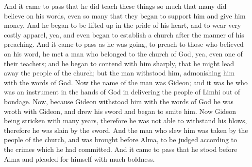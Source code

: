 And it came to pass that he did teach these things so much that many did believe on his words, even so many that they began to support him and give him money.
\bverse \iffalse And he began to be lifted up in the pride of his heart, and to wear very costly apparel, yea, and even began to establish a church after the manner of his preaching. \fi
And he began to be lifted up in the pride of his heart, and to wear very costly apparel, yea, and even began to establish a church after the manner of his preaching.
\bverse \iffalse And it came to pass as he was going, to preach to those who believed on his word, he met a man who belonged to the church of God, yea, even one of their teachers; and he began to contend with him sharply, that he might lead away the people of the church; but the man withstood him, admonishing him with the words of God. \fi
And it came to pass as he was going, to preach to those who believed on his word, he met a man who belonged to the church of God, yea, even one of their teachers; and he began to contend with him sharply, that he might lead away the people of the church; but the man withstood him, admonishing him with the words of God.
\bverse \iffalse Now the name of the man was Gideon; and it was he who was an instrument in the hands of God in delivering the people of Limhi out of bondage. \fi
Now the name of the man was Gideon; and it was he who was an instrument in the hands of God in delivering the people of Limhi out of bondage.
\bverse \iffalse Now, because Gideon withstood him with the words of God he was wroth with Gideon, and drew his sword and began to smite him.  Now Gideon being stricken with many years, therefore he was not able to withstand his blows, therefore he was slain by the sword. \fi
Now, because Gideon withstood him with the words of God he was wroth with Gideon, and drew his sword and began to smite him.  Now Gideon being stricken with many years, therefore he was not able to withstand his blows, therefore he was slain by the sword.
\bverse \iffalse And the man who slew him was taken by the people of the church, and was brought before Alma, to be judged according to the crimes which he had committed. \fi
And the man who slew him was taken by the people of the church, and was brought before Alma, to be judged according to the crimes which he had committed.
\bverse \iffalse And it came to pass that he stood before Alma and pleaded for himself with much boldness. \fi
And it came to pass that he stood before Alma and pleaded for himself with much boldness.
